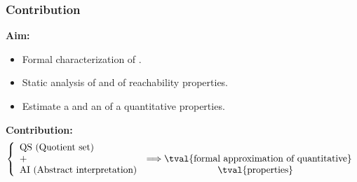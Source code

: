 \begin{frame}
 \frametitle{Contribution}
 
\begin{figure}[h]
\centering
{}
 \end{figure}
 \hspace{5cm}
 
 \textbf{Aim:}
 \begin{itemize}
  \item Formal characterization of .
  \item Static analysis of  and  of reachability properties.
  \item Estimate a  and an  of a quantitative properties.  
 \end{itemize}
 \textbf{Contribution:}
 $$
\left\{
    \begin{array}{lcl}
        \mbox{QS (Quotient set)} &\\  %
        \mbox{+} & \Longrightarrow \mbox{\tval{formal approximation of quantitative}} \\
        \mbox{AI (Abstract interpretation)} & \mbox{\ \ \ \ \tval{properties}}
    \end{array}
\right.
$$ 
 

\end{frame}


